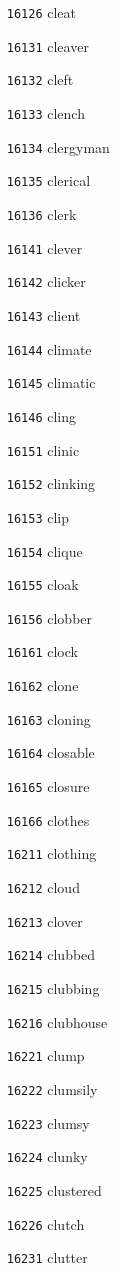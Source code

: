\documentclass[twoside,11pt]{article}
\begin{document}
\begin{multicols}{5}
\begin{enumerate}
\item[\texttt{16126}] cleat
\item[\texttt{16131}] cleaver
\item[\texttt{16132}] cleft
\item[\texttt{16133}] clench
\item[\texttt{16134}] clergyman
\item[\texttt{16135}] clerical
\item[\texttt{16136}] clerk
\item[\texttt{16141}] clever
\item[\texttt{16142}] clicker
\item[\texttt{16143}] client
\item[\texttt{16144}] climate
\item[\texttt{16145}] climatic
\item[\texttt{16146}] cling
\item[\texttt{16151}] clinic
\item[\texttt{16152}] clinking
\item[\texttt{16153}] clip
\item[\texttt{16154}] clique
\item[\texttt{16155}] cloak
\item[\texttt{16156}] clobber
\item[\texttt{16161}] clock
\item[\texttt{16162}] clone
\item[\texttt{16163}] cloning
\item[\texttt{16164}] closable
\item[\texttt{16165}] closure
\item[\texttt{16166}] clothes
\item[\texttt{16211}] clothing
\item[\texttt{16212}] cloud
\item[\texttt{16213}] clover
\item[\texttt{16214}] clubbed
\item[\texttt{16215}] clubbing
\item[\texttt{16216}] clubhouse
\item[\texttt{16221}] clump
\item[\texttt{16222}] clumsily
\item[\texttt{16223}] clumsy
\item[\texttt{16224}] clunky
\item[\texttt{16225}] clustered
\item[\texttt{16226}] clutch
\item[\texttt{16231}] clutter

\end{enumerate}
\end{multicols}
\end{document}
